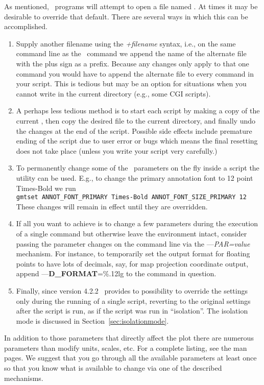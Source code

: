 As mentioned, \GMT\ programs will attempt to open a file named
.  At times it may be desirable to override
that default.  There are several ways in which this can be accomplished.
\begin{enumerate}
\item Supply another filename using the \emph{+filename} syntax, i.e.,
on the same command line as the \GMT\ command we append the name of
the alternate  file with the plus sign as a prefix.
Because any changes only apply to that one command you would have to
append the alternate file to every command in your script.  This is
tedious but may be an option for situations when you cannot write in
the current directory (e.g., some CGI scripts).
\item A perhaps less tedious method is to start each script by making a
copy of the current , then copy the desired
 file to the current directory, and finally
undo the changes at the end of the script.  Possible side effects
include premature ending of the script due to user error or bugs which
means the final resetting does not take place (unless you write your
script very carefully.)
\item To permanently change some of the \GMT\ parameters on the fly
inside a script the  utility can be used.  E.g., to
change the primary annotation font to 12 point Times-Bold we run \\

\texttt{gmtset ANNOT\_FONT\_PRIMARY Times-Bold ANNOT\_FONT\_SIZE\_PRIMARY 12} \\

These changes will remain in effect until they are overridden.
\item If all you want to achieve is to change a few parameters during
the execution of a single command but otherwise leave the environment intact, consider
passing the parameter changes on the command line via the {--}{--}\emph{PAR=value}
mechanism.  For instance, to temporarily set the output format for floating
points to have lots of decimals, say, for map projection coordinate output,
append {--}{--}\textbf{D\_FORMAT}=\%.12lg to the command in question.
\item Finally, since version 4.2.2 \GMT\ provides to possibility to override the settings only  during the running of a single script, reverting to the original settings after the script is run, as if the script was run in ``isolation''. The isolation mode is discussed in Section~\ref{sec:isolationmode}.
\end{enumerate}
In addition to those parameters
that directly affect the plot there are numerous parameters than
modify units, scales, etc.  For a complete listing, see the
 man pages.  We suggest that you go through
all the available parameters at least once so that you know what is
available to change via one of the described mechanisms.


